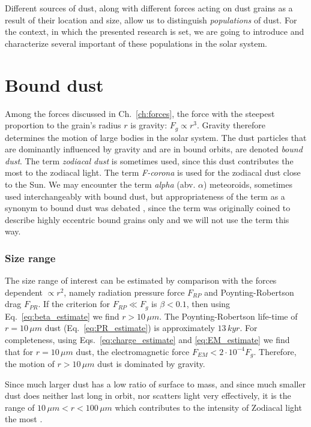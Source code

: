 Different sources of dust, along with different forces acting on dust grains as a result of their location and size, allow us to distinguish \textit{populations} of dust. For the context, in which the presented research is set, we are going to introduce and characterize several important of these populations in the solar system.

\section{Bound dust}

Among the forces discussed in Ch.~\ref{ch:forces}, the force with the steepest proportion to the grain's radius $r$ is gravity: $F_g \propto r^3$. Gravity therefore determines the motion of large bodies in the solar system. The dust particles that are dominantly influenced by gravity and are in bound orbits, are denoted \textit{bound dust}. The term \textit{zodiacal dust} is sometimes used, since this dust contributes the most to the zodiacal light. The term \textit{F-corona} is used for the zodiacal dust close to the Sun. We may encounter the term \textit{alpha} (abv. $\alpha$) meteoroids, sometimes used interchangeably with bound dust, but appropriateness of the term as a synonym to bound dust was debated \citep{sommer2023alpha}, since the term was originally coined to describe highly eccentric bound grains only \citep{zook1975source} and we will not use the term this way.

\subsubsection{Size range}

The size range of interest can be estimated by comparison with the forces dependent $\propto r^2$, namely radiation pressure force $F_{RP}$ and Poynting-Robertson drag $F_{PR}$. If the criterion for $F_{RP} \ll F_g$ is $\beta<0.1$, then using Eq.~\ref{eq:beta_estimate} we find $r>10 \, \si{\mu m}$. The Poynting-Robertson life-time of $r=10 \, \si{\mu m}$ dust (Eq.~\ref{eq:PR_estimate}) is approximately $13 \, \si{kyr}$. For completeness, using Eqs.~\ref{eq:charge_estimate} and \ref{eq:EM_estimate} we find that for $r=10 \, \si{\mu m}$ dust, the electromagnetic force $F_{EM} < 2\cdot 10^{-4} F_g$. Therefore, the motion of $r>10 \, \si{\mu m}$ dust is dominated by gravity.

Since much larger dust has a low ratio of surface to mass, and since much smaller dust does neither last long in orbit, nor scatters light very effectively, it is the range of $10 \, \si{\mu m} < r < 100 \, \si{\mu m}$ which contributes to the intensity of Zodiacal light the most \citep{leinert1981zodiacal}. 

